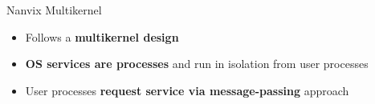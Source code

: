		\begin{frame}[fragile]{Nanvix Multikernel}

			\begin{itemize}
				\item Follows a \textbf{multikernel design}
				\item \textbf{OS services are processes} and run in isolation from user processes
				\item User processes \textbf{request service via message-passing} approach
			\end{itemize}


		\end{frame}

